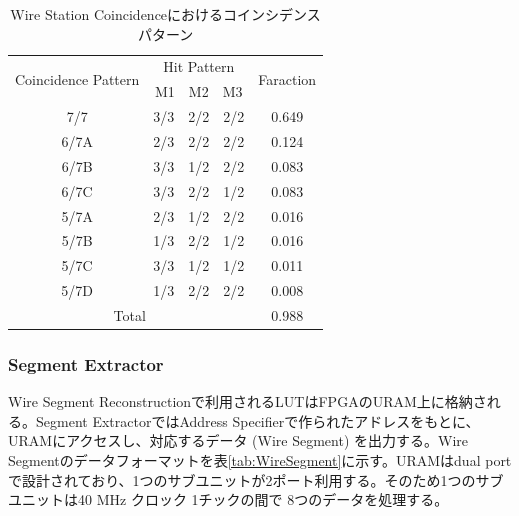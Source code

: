 \begin{table}[h]
    \centering
    \caption{Wire Station Coincidenceにおけるコインシデンスパターン}
    \label{tab:StationCoin_wire}
    \begin{tabular}{|cc|c|}
    \hline
    \multicolumn{1}{|c|}{\multirow{2}{*}{Coincidence Pattern}} & Hit Pattern & \multirow{2}{*}{Faraction} \\ \cline{2-2}
    \multicolumn{1}{|c|}{}                                     & M1　M2　M3    &                            \\ \hline\hline
    \multicolumn{1}{|c|}{7/7}                                  & 3/3　2/2　2/2 & 0.649                      \\ \hline
    \multicolumn{1}{|c|}{6/7A}                                 & 2/3　2/2　2/2 & 0.124                      \\ \hline
    \multicolumn{1}{|c|}{6/7B}                                 & 3/3　1/2　2/2 & 0.083                      \\ \hline
    \multicolumn{1}{|c|}{6/7C}                        & 3/3　2/2　1/2 & 0.083                      \\ \hline
    \multicolumn{1}{|c|}{5/7A}                                 & 2/3　1/2　2/2 & 0.016                      \\ \hline
    \multicolumn{1}{|c|}{5/7B}                                 & 1/3　2/2　1/2 & 0.016                      \\ \hline
    \multicolumn{1}{|c|}{5/7C}                                 & 3/3　1/2　1/2 & 0.011                      \\ \hline
    \multicolumn{1}{|c|}{5/7D}                                 & 1/3　2/2　2/2 & 0.008                      \\ \hline\hline
    \multicolumn{2}{|c|}{Total}                                              & 0.988                      \\ \hline
    \end{tabular}
\end{table}

\subsubsection*{Segment Extractor}
Wire Segment Reconstructionで利用されるLUTはFPGAのURAM上に格納される。Segment ExtractorではAddress Specifierで作られたアドレスをもとに、URAMにアクセスし、対応するデータ (Wire Segment) を出力する。Wire Segmentのデータフォーマットを表\ref{tab:WireSegment}に示す。URAMはdual portで設計されており、1つのサブユニットが2ポート利用する。そのため1つのサブユニットは40 MHz クロック 1チックの間で 8つのデータを処理する。


